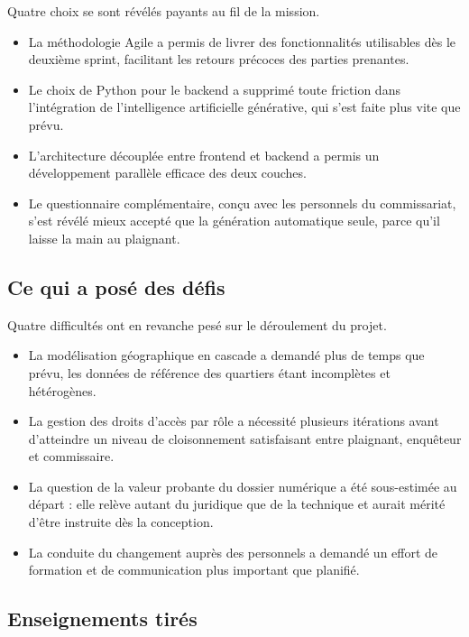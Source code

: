Quatre choix se sont révélés payants au fil de la mission.

\begin{itemize}
    \item La méthodologie Agile a permis de livrer des fonctionnalités utilisables dès le deuxième sprint, facilitant les retours précoces des parties prenantes.
    \item Le choix de Python pour le backend a supprimé toute friction dans l'intégration de l'intelligence artificielle générative, qui s'est faite plus vite que prévu.
    \item L'architecture découplée entre frontend et backend a permis un développement parallèle efficace des deux couches.
    \item Le questionnaire complémentaire, conçu avec les personnels du commissariat, s'est révélé mieux accepté que la génération automatique seule, parce qu'il laisse la main au plaignant.
\end{itemize}

\subsection{Ce qui a posé des défis}

Quatre difficultés ont en revanche pesé sur le déroulement du projet.

\begin{itemize}
    \item La modélisation géographique en cascade a demandé plus de temps que prévu, les données de référence des quartiers étant incomplètes et hétérogènes.
    \item La gestion des droits d'accès par rôle a nécessité plusieurs itérations avant d'atteindre un niveau de cloisonnement satisfaisant entre plaignant, enquêteur et commissaire.
    \item La question de la valeur probante du dossier numérique a été sous-estimée au départ : elle relève autant du juridique que de la technique et aurait mérité d'être instruite dès la conception.
    \item La conduite du changement auprès des personnels a demandé un effort de formation et de communication plus important que planifié.
\end{itemize}

\subsection{Enseignements tirés}

